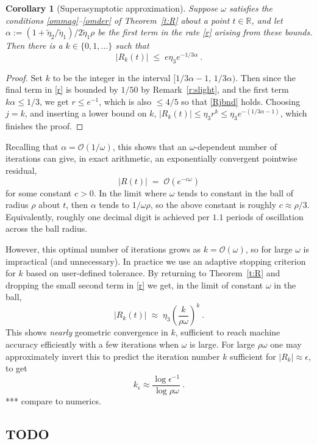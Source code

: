 \documentclass[10pt]{article}
\newcommand{\R}{\mathbb{R}}
\newcommand{\bigO}{{\mathcal O}}
\newcommand{\eps}{\epsilon}
\newtheorem{cor}[thm]{Corollary}
\newcommand{\om}{\omega}
\newcommand{\te}{\tilde\eta}
\begin{document}
\begin{cor}[Superasymptotic approximation]\label{super}
  Suppose $\om$ satisfies the conditions \eqref{ommag}--\eqref{omder}
  of Theorem~\ref{t:R}
  about a point $t\in\R$,
  and let $\alpha := (1+\te_2/\te_1)/2\te_1\rho$ be the
  first term in the rate \eqref{r} arising from these bounds.
  Then there is a $k\in\{0,1,\dots\}$ such that
  $$
  |R_k(t)| \; \le \; e \eta_3 e^{-1/3\alpha}~.
  $$
\end{cor}
\begin{proof}
  Set $k$ to be the integer in the interval $[1/3\alpha-1, \, 1/3\alpha)$.
    Then since the final term in \eqref{r} is bounded by $1/50$
    by Remark~\ref{r:slight}, and the
    first term $k\alpha \le 1/3$, we get $r\le e^{-1}$, which
    is also $\le 4/5$ so that \eqref{Rjbnd} holds.
    Choosing $j=k$, and inserting a lower bound on $k$,
    $|R_k(t)| \le \eta_3 r^k \le \eta_3 e^{-(1/3\alpha-1)}$, which
    finishes the proof.
  \end{proof}
Recalling that $\alpha = \bigO(1/\om)$, this
shows that an $\om$-dependent
number of iterations can give, in exact arithmetic, an
exponentially convergent pointwise residual,
$$
|R(t)| \;=\; \bigO(e^{-c\om})
$$
for some constant $c>0$.
In the limit where
$\om$ tends to constant in the ball of radius $\rho$ about $t$, then
$\alpha$ tends to $1/\om\rho$, so the above
constant is roughly $c\approx \rho/3$.
Equivalently, roughly one decimal digit is achieved per
$1.1$ periods of oscillation across the ball radius.

However, this optimal number of iterations grows as $k = \bigO(\om)$,
so for large $\om$ is impractical (and unnecessary).
In practice we use an adaptive stopping criterion for $k$ based
on user-defined tolerance.
By returning to Theorem~\ref{t:R} and dropping the small second term
in \eqref{r} we get, in the limit of constant $\om$ in the ball,
$$
|R_k(t)| \; \approx \; \eta_3 \left( \frac{k}{\rho\om}\right)^k~.
$$
This shows \textit{nearly} geometric convergence in $k$,
sufficient to reach machine accuracy efficiently with a few iterations
when $\om$ is large.
For large $\rho\om$ one may approximately invert this to predict the iteration number $k$ sufficient for $|R_k| \approx \eps$, to get
$$
k_\eps \approx \frac{\log \eps^{-1}}{\log \rho\om}~.
$$
*** compare to numerics.



\subsection{TODO}
\end{document}
